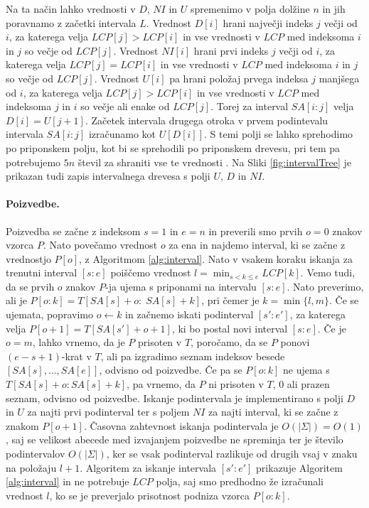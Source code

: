 Na ta način lahko vrednosti v $D$, $NI$ in $U$ spremenimo v polja dolžine $n$ in jih poravnamo z začetki intervala $L$. Vrednost $D[i]$ hrani največji indeks $j$ večji od $i$, za katerega velja $LCP[j]>LCP[i]$ in vse vrednosti v $LCP$ med indeksoma $i$ in $j$ so večje od $LCP[j]$. Vrednost $NI[i]$ hrani prvi indeks $j$ večji od $i$, za katerega velja $LCP[j]=LCP[i]$ in vse vrednosti v $LCP$ med indeksoma $i$ in $j$ so večje od $LCP[j]$. Vrednost $U[i]$ pa hrani položaj prvega indeksa $j$ manjšega od $i$, za katerega velja $LCP[j]>LCP[i]$ in vse vrednosti v $LCP$ med indeksoma $j$ in $i$ so večje ali enake od $LCP[j]$. Torej za interval $SA[i:j]$ velja $D[i]=U[j+1]$. Začetek intervala drugega otroka v prvem podintevalu intervala $SA[i:j]$ izračunamo kot $U[D[i]]$. S temi polji se lahko sprehodimo po priponskem polju, kot bi se sprehodili po priponskem drevesu, pri tem pa potrebujemo $5n$ števil za shraniti vse te vrednosti \cite{Abouelhoda2004}. Na Sliki \ref{fig:intervalTree} je prikazan tudi zapis intervalnega drevesa s polji $U$, $D$ in $NI$. 

\paragraph{Poizvedbe.}
Poizvedba se začne z indeksom $s=1$ in $e=n$ in preverili smo prvih $o=0$ znakov vzorca $P$. Nato povečamo vrednost $o$ za ena in najdemo interval, ki se začne z vrednostjo $P[o]$, z Algoritmom \ref{alg:interval}. Nato v vsakem koraku iskanja za trenutni interval $[s:e]$ poiščemo vrednost $l=\min_{s<k\le e}LCP[k]$. Vemo tudi, da se prvih $o$ znakov $P$-ja ujema s priponami na intervalu $[s:e]$. Nato preverimo, ali je $P[o:k]=T[SA[s]+o:\; SA[s]+k]$, pri čemer je $k=\min\{l,m\}$. Če se ujemata, popravimo $o\leftarrow k$ in začnemo iskati podinterval $[s':e']$, za katerega velja $P[o+1]=T[SA[s']+o+1]$, ki bo postal novi interval $[s:e]$. Če je $o=m$, lahko vrnemo, da je $P$ prisoten v $T$, poročamo, da se $P$ ponovi $(e-s+1)$-krat v $T$, ali pa izgradimo seznam indeksov besede $[SA[s],\dots,SA[e]]$, odvisno od poizvedbe. Če pa se $P[o:k]$ ne ujema s $T[SA[s]+o:SA[s]+k]$, pa vrnemo, da $P$ ni prisoten v $T$, 0 ali prazen seznam, odvisno od poizvedbe. Iskanje podintervala je implementirano s polji $D$ in $U$ za najti prvi podinterval ter s poljem $NI$ za najti interval, ki se začne z znakom $P[o+1]$. Časovna zahtevnost iskanja podintervala je $O(|\Sigma|)=O(1)$, saj se velikost abecede med izvajanjem poizvedbe ne spreminja ter je število podintervalov $O(|\Sigma|)$, ker se vsak podinterval razlikuje od drugih vsaj v znaku na položaju $l+1$. Algoritem za iskanje intervala $[s':e']$ prikazuje Algoritem \ref{alg:interval} in ne potrebuje $LCP$ polja, saj smo predhodno že izračunali vrednost $l$, ko se je preverjalo prisotnost podniza vzorca $P[o:k]$. 

